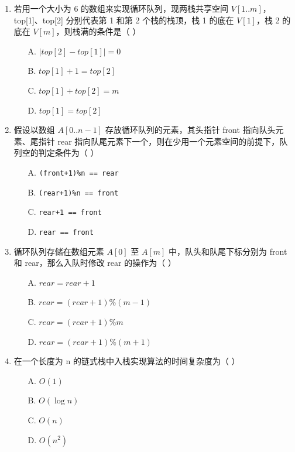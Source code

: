 \documentclass[12pt, a4paper]{article}
\begin{document}
\begin{enumerate}[label=\arabic*.]
	\item 若用一个大小为 6 的数组来实现循环队列，现两栈共享空间 $V[1..m]$，top[1]、top[2] 分别代表第 1 和第 2 个栈的栈顶，栈 1 的底在 $V[1]$，栈 2 的底在 $V[m]$，则栈满的条件是（ ）
	      \begin{enumerate}
		      \item[A.] $|top[2] - top[1]| = 0$
		      \item[B.] $top[1] + 1 = top[2]$
		      \item[C.] $top[1] + top[2] = m$
		      \item[D.] $top[1] = top[2]$
	      \end{enumerate}

	\item 假设以数组 $A[0..n-1]$ 存放循环队列的元素，其头指针 front 指向队头元素、尾指针 rear 指向队尾元素下一个，则在少用一个元素空间的前提下，队列空的判定条件为（ ）
	      \begin{enumerate}
		      \item[A.] \texttt{(front+1)\%n == rear}
		      \item[B.] \texttt{(rear+1)\%n == front}
		      \item[C.] \texttt{rear+1 == front}
		      \item[D.] \texttt{rear == front}
	      \end{enumerate}

	\item 循环队列存储在数组元素 $A[0]$ 至 $A[m]$ 中，队头和队尾下标分别为 front 和 rear，那么入队时修改 rear 的操作为（ ）
	      \begin{enumerate}
		      \item[A.] $rear = rear + 1$
		      \item[B.] $rear = (rear + 1) \% (m-1)$
		      \item[C.] $rear = (rear + 1) \% m$
		      \item[D.] $rear = (rear + 1) \% (m+1)$
	      \end{enumerate}

	\item 在一个长度为 n 的链式栈中入栈实现算法的时间复杂度为（ ）
	      \begin{enumerate}
		      \item[A.] $O(1)$
		      \item[B.] $O(\log n)$
		      \item[C.] $O(n)$
		      \item[D.] $O(n^2)$
	      \end{enumerate}


\end{enumerate}
\end{document}
